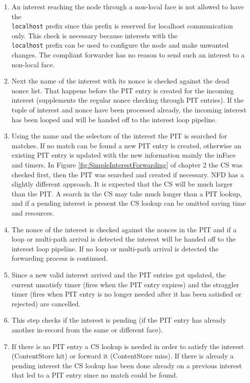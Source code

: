 \begin{enumerate}
\item An interest reaching the node through a non-local face is not allowed to have the \texttt{\\localhost} prefix since this prefix is reserved for localhost communication only. This check is necessary because interests with the \texttt{\\localhost} prefix can be used to configure the node and make unwanted changes. The compliant forwarder has no reason to send such an interest to a non-local face.
\item Next the name of the interest with its nonce is checked against the dead nonce list. That happens before the PIT entry is created for the incoming interest (supplements the regular nonce checking through PIT entries). If the tuple of interest and nonce have been processed already, the incoming interest has been looped and will be handed off to the interest loop pipeline.
\item Using the name and the selectors of the interest the PIT is searched for matches. If no match can be found a new PIT entry is created, otherwise an existing PIT entry is updated with the new information mainly the inFace and timers. In Figure \ref{fig:SimpleInterestForwarding} of chapter 2 the CS was checked first, then the PIT was searched and created if necessary. NFD has a slightly different approach. It is expected that the CS will be much larger than the PIT. A search in the CS may take much longer than a PIT lookup, and if a pending interest is present the CS lookup can be omitted saving time and resources.
\item The nonce of the interest is checked against the nonces in the PIT and if a loop or multi-path arrival is detected the interest will be handed off to the interest loop pipeline. If no loop or multi-path arrival is detected the forwarding process is continued.
\item Since a new valid interest arrived and the PIT entries got updated, the current unsatisfy timer (fires when the PIT entry expires) and the straggler timer (fires when PIT entry is no longer needed after it has been satisfied or rejected) are cancelled.
\item This step checks if the interest is pending (if the PIT entry has already another in-record from the same or different face).
\item If there is no PIT entry a CS lookup is needed in order to satisfy the interest (ContentStore hit) or forward it (ContentStore miss). If there is already a pending interest the CS lookup has been done already on a previous interest that led to a PIT entry since no match could be found.
\end{enumerate}


